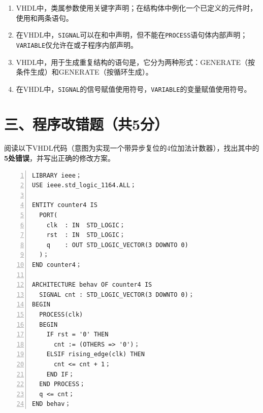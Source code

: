 \begin{enumerate}[label=\arabic*.]
\item VHDL中，类属参数使用关键字\underline{\hspace{2.5cm}}声明；在结构体中例化一个已定义的元件时，使用\underline{\hspace{2.5cm}}和\underline{\hspace{2.5cm}}两条语句。

\item 在VHDL中，\texttt{SIGNAL}可以在\underline{\hspace{3cm}}和\underline{\hspace{3cm}}中声明，但不能在\texttt{PROCESS}语句体内部声明；\texttt{VARIABLE}仅允许在\underline{\hspace{3cm}}或子程序内部声明。

\item VHDL中，用于生成重复结构的语句是\underline{\hspace{2.5cm}}，它分为两种形式：\underline{\hspace{2cm}}GENERATE（按条件生成）和\underline{\hspace{2cm}}GENERATE（按循环生成）。

\item 在VHDL中，\texttt{SIGNAL}的信号赋值使用符号\underline{\hspace{1.5cm}}，\texttt{VARIABLE}的变量赋值使用符号\underline{\hspace{1.5cm}}。
\end{enumerate}

\newpage

\section*{三、程序改错题（共5分）}

阅读以下VHDL代码（意图为实现一个带异步复位的4位加法计数器），找出其中的\textbf{5处错误}，并写出正确的修改方案。

\begin{lstlisting}[caption={存在错误的VHDL代码}, numbers=left]
LIBRARY ieee；
USE ieee.std_logic_1164.ALL；

ENTITY counter4 IS
  PORT(
    clk  : IN  STD_LOGIC；
    rst  : IN  STD_LOGIC；
    q    : OUT STD_LOGIC_VECTOR(3 DOWNTO 0)
  )；
END counter4；

ARCHITECTURE behav OF counter4 IS
  SIGNAL cnt : STD_LOGIC_VECTOR(3 DOWNTO 0)；
BEGIN
  PROCESS(clk)
  BEGIN
    IF rst = '0' THEN
      cnt := (OTHERS => '0')；
    ELSIF rising_edge(clk) THEN
      cnt <= cnt + 1；
    END IF；
  END PROCESS；
  q <= cnt；
END behav；
\end{lstlisting}

